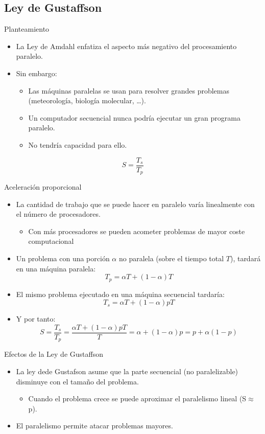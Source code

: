 \subsection{Ley de Gustaffson}

\begin{frame}[t]{Planteamiento}
\begin{itemize}
\item La Ley de Amdahl enfatiza el aspecto más negativo del procesamiento paralelo.
\item Sin embargo:
  \begin{itemize}
    \item Las máquinas paralelas se usan para resolver grandes problemas (meteorología, biología molecular, \ldots).
    \item Un computador secuencial nunca podría ejecutar un gran programa paralelo.
    \item No tendría capacidad para ello.
  \end{itemize}
\end{itemize}
\vfill
\[
S = \frac{T_s}{T_p}
\]
\end{frame}

\begin{frame}[t]{Aceleración proporcional}
\begin{itemize}
  \item La cantidad de trabajo que se puede hacer en paralelo varía linealmente con el número de procesadores.
    \begin{itemize}
      \item Con más procesadores se pueden acometer problemas de mayor coste computacional
  \end{itemize}
  \item Un problema con una porción $\alpha$ no paralela (sobre el tiempo total $T$), tardará en una máquina paralela:
\[
T_p = \alpha T + (1-\alpha) T
\]
  \item El mismo problema ejecutado en una máquina secuencial tardaría:
\[
T_s = \alpha T + (1-\alpha) p T
\]
  \item Y por tanto:
\[
S = \frac{T_s}{T_p} = 
\frac{\alpha T + (1-\alpha) p T}{T} = \alpha + (1-\alpha) p =
p + \alpha (1 - p)
\]
\end{itemize}
\end{frame}

\begin{frame}[t]{Efectos de la Ley de Gustaffson}
\begin{itemize}
  \item La ley dede Gustafson asume que la parte secuencial (no paralelizable) disminuye con el tamaño del problema.
    \begin{itemize}
      \item Cuando el problema crece se puede aproximar el paralelismo lineal (S$\approx$p).
    \end{itemize}
  \vfill
  \item El paralelismo permite atacar problemas mayores.
\end{itemize}
\end{frame}

